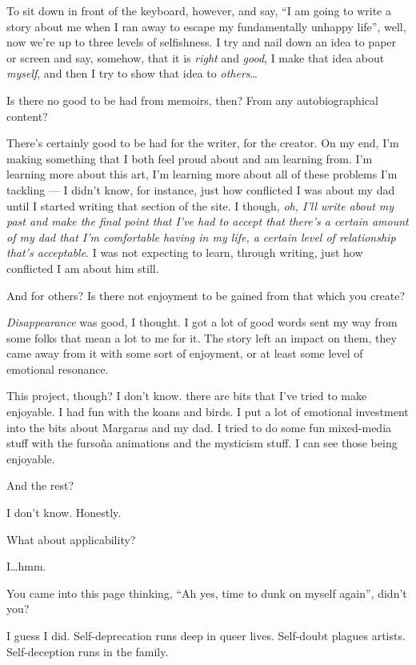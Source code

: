 To sit down in front of the keyboard, however, and say, ``I am going to write a story about me when I ran away to escape my fundamentally unhappy life'', well, now we're up to three levels of selfishness. I try and nail down an idea to paper or screen and say, somehow, that it is \emph{right} and \emph{good}, I make that idea about \emph{myself}, and then I try to show that idea to \emph{others}\ldots{}

\begin{ally}
Is there no good to be had from memoirs, then? From any autobiographical content?
\end{ally}
There's certainly good to be had for the writer, for the creator. On my end, I'm making something that I both feel proud about and am learning from. I'm learning more about this art, I'm learning more about all of these problems I'm tackling --- I didn't know, for instance, just how conflicted I was about my dad until I started writing that section of the site. I though, \emph{oh, I'll write about my past and make the final point that I've had to accept that there's a certain amount of my dad that I'm comfortable having in my life, a certain level of relationship that's acceptable}. I was not expecting to learn, through writing, just how conflicted I am about him still.

\begin{ally}
And for others? Is there not enjoyment to be gained from that which you create?
\end{ally}
\emph{Disappearance} was good, I thought. I got a lot of good words sent my way from some folks that mean a lot to me for it. The story left an impact on them, they came away from it with some sort of enjoyment, or at least some level of emotional resonance.

This project, though? I don't know. there are bits that I've tried to make enjoyable. I had fun with the koans and birds. I put a lot of emotional investment into the bits about Margaras and my dad. I tried to do some fun mixed-media stuff with the fursoña animations and the mysticism stuff. I can see those being enjoyable.

\begin{ally}
And the rest?
\end{ally}
I don't know. Honestly.

\begin{ally}
What about applicability?
\end{ally}
I\ldots{}hmm.

\begin{ally}
You came into this page thinking, ``Ah yes, time to dunk on myself again'', didn't you?
\end{ally}
I guess I did. Self-deprecation runs deep in queer lives. Self-doubt plagues artists. Self-deception runs in the family.

